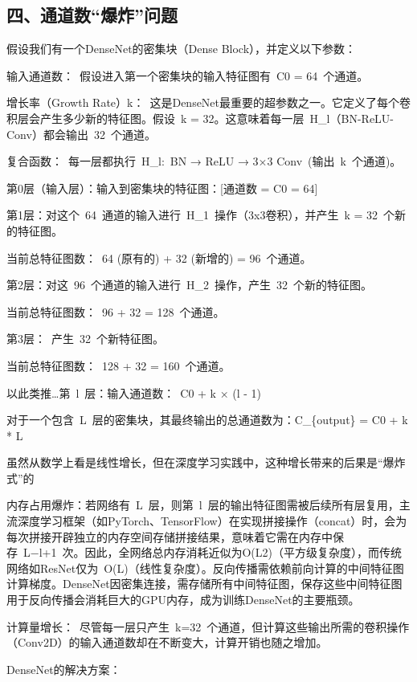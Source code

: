 \hypertarget{ux56dbux901aux9053ux6570ux7206ux70b8ux95eeux9898}{%
\subsection{四、通道数``爆炸''问题}\label{ux56dbux901aux9053ux6570ux7206ux70b8ux95eeux9898}}

假设我们有一个DenseNet的密集块（Dense Block），并定义以下参数：

输入通道数：~假设进入第一个密集块的输入特征图有~C0 = 64~个通道。

增长率（Growth Rate）k：~这是DenseNet最重要的超参数之一。它定义了每个卷积层会产生多少新的特征图。假设~k = 32。这意味着每一层~H\_l（BN-ReLU-Conv）都会输出~32~个通道。

复合函数：~每一层都执行~H\_l:~BN → ReLU → 3×3 Conv~(输出~k~个通道)。

第0层（输入层）：输入到密集块的特征图：{[}通道数 = C0 = 64{]}

第1层：对这个~64~通道的输入进行~H\_1~操作（3x3卷积），并产生~k = 32~个新的特征图。

当前总特征图数：~64 (原有的) + 32 (新增的) = 96~个通道。

第2层：对这~96~个通道的输入进行~H\_2~操作，产生~32~个新的特征图。

当前总特征图数：~96 + 32 = 128~个通道。

第3层：~产生~32~个新特征图。

当前总特征图数：~128 + 32 = 160~个通道。

以此类推\ldots 第~l~层：输入通道数：~C0 + k × (l - 1)

对于一个包含~L~层的密集块，其最终输出的总通道数为：C\_\{output\} = C0 + k * L

虽然从数学上看是线性增长，但在深度学习实践中，这种增长带来的后果是``爆炸式''的

内存占用爆炸：若网络有~L~层，则第~l~层的输出特征图需被后续所有层复用，主流深度学习框架（如PyTorch、TensorFlow）在实现拼接操作（concat）时，会为每次拼接开辟独立的内存空间存储拼接结果，意味着它需在内存中保存~L−l+1~次。因此，全网络总内存消耗近似为O(L2)（平方级复杂度），而传统网络如ResNet仅为~O(L)（线性复杂度）。反向传播需依赖前向计算的中间特征图计算梯度。DenseNet因密集连接，需存储所有中间特征图，保存这些中间特征图用于反向传播会消耗巨大的GPU内存，成为训练DenseNet的主要瓶颈。

计算量增长：~尽管每一层只产生~k=32~个通道，但计算这些输出所需的卷积操作（Conv2D）的输入通道数却在不断变大，计算开销也随之增加。

DenseNet的解决方案：

